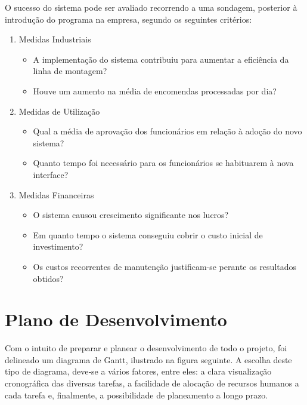     O sucesso do sistema pode ser avaliado recorrendo a uma sondagem, posterior à introdução do programa na empresa, segundo os seguintes critérios:
    \begin{enumerate}
        \item Medidas Industriais
            \begin{itemize}
                \item A implementação do sistema contribuiu para aumentar a eficiência da linha de montagem?
                \item Houve um aumento na média de encomendas processadas por dia?
            \end{itemize}
        \item Medidas de Utilização 
            \begin{itemize}
                \item Qual a média de aprovação dos funcionários em relação à adoção do novo sistema?
                \item Quanto tempo foi necessário para os funcionários se habituarem à nova interface?
            \end{itemize}
        \item Medidas Financeiras  
            \begin{itemize}
                \item O sistema causou crescimento significante nos lucros?
                \item Em quanto tempo o sistema conseguiu cobrir o custo inicial de investimento?
                \item Os custos recorrentes de manutenção justificam-se perante os resultados obtidos?
            \end{itemize}
    
    
    \end{enumerate}
     
    \newpage
    \section{Plano de Desenvolvimento}
    
        Com o intuito de preparar e planear o desenvolvimento de todo o projeto, foi delineado um diagrama de Gantt, ilustrado na figura seguinte. A escolha deste tipo de diagrama, deve‐se a vários fatores, entre eles: a clara visualização cronográfica das diversas tarefas, a facilidade de alocação de recursos humanos a cada tarefa e, finalmente, a possibilidade de planeamento a longo prazo.
        

